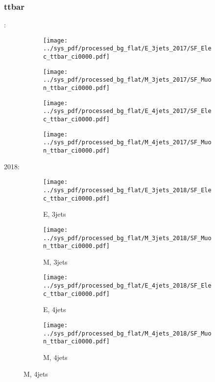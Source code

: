 \documentclass{beamer}
\begin{document}
\begin{frame}
\frametitle{ttbar}
\fontsize{5}{1}:
\begin{figure}
\centering
\begin{subfigure}[b]{0.24\textwidth}
\texttt{[image: ../sys\_pdf/processed\_bg\_flat/E\_3jets\_2017/SF\_Elec\_ttbar\_ci0000.pdf]}
\end{subfigure}
\begin{subfigure}[b]{0.24\textwidth}
\texttt{[image: ../sys\_pdf/processed\_bg\_flat/M\_3jets\_2017/SF\_Muon\_ttbar\_ci0000.pdf]}
\end{subfigure}
\begin{subfigure}[b]{0.24\textwidth}
\texttt{[image: ../sys\_pdf/processed\_bg\_flat/E\_4jets\_2017/SF\_Elec\_ttbar\_ci0000.pdf]}
\end{subfigure}
\begin{subfigure}[b]{0.24\textwidth}
\texttt{[image: ../sys\_pdf/processed\_bg\_flat/M\_4jets\_2017/SF\_Muon\_ttbar\_ci0000.pdf]}
\end{subfigure}
\end{figure}
2018:
\begin{figure}
\centering
\begin{subfigure}[b]{0.24\textwidth}
\texttt{[image: ../sys\_pdf/processed\_bg\_flat/E\_3jets\_2018/SF\_Elec\_ttbar\_ci0000.pdf]}
\captionsetup{font=tiny}
\caption{E, 3jets}
\end{subfigure}
\begin{subfigure}[b]{0.24\textwidth}
\texttt{[image: ../sys\_pdf/processed\_bg\_flat/M\_3jets\_2018/SF\_Muon\_ttbar\_ci0000.pdf]}
\captionsetup{font=tiny}
\caption{M, 3jets}
\end{subfigure}
\begin{subfigure}[b]{0.24\textwidth}
\texttt{[image: ../sys\_pdf/processed\_bg\_flat/E\_4jets\_2018/SF\_Elec\_ttbar\_ci0000.pdf]}
\captionsetup{font=tiny}
\caption{E, 4jets}
\end{subfigure}
\begin{subfigure}[b]{0.24\textwidth}
\texttt{[image: ../sys\_pdf/processed\_bg\_flat/M\_4jets\_2018/SF\_Muon\_ttbar\_ci0000.pdf]}
\captionsetup{font=tiny}
\caption{M, 4jets}
\end{subfigure}
\end{figure}
\end{frame}
\end{document}
